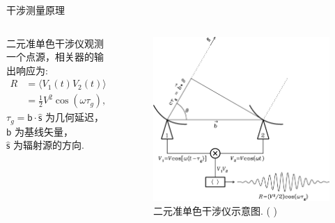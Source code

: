 \documentclass{beamer}
\newcommand{\B}[1]{\bm{\mathsf{#1}}}  %
\newcommand{\citeay}[1]{\citeauthor{#1} \citeyear{#1} \parencite{#1}}
\begin{document}
\begin{frame}{干涉测量原理}
  \begin{columns}
    二元准单色干涉仪观测一个点源，相关器的输出响应为:
    \begin{align}
      R & = \langle V_1(t) V_2(t) \rangle \\
        & = \frac{1}{2} V^2 \cos (\omega \tau_g) ,
    \end{align}
    $\tau_g = \B{b} \cdot \hat{\B{s}}$ 为几何延迟，\\
    $\B{b}$ 为基线矢量，\\
    $\hat{\B{s}}$ 为辐射源的方向.

    \begin{figure}
      \centering
      \includegraphics[width=\columnwidth]{interferometer}
      \caption{二元准单色干涉仪示意图. (\citeay{condon2016})}
    \end{figure}
  \end{columns}
\end{frame}
\end{document}
